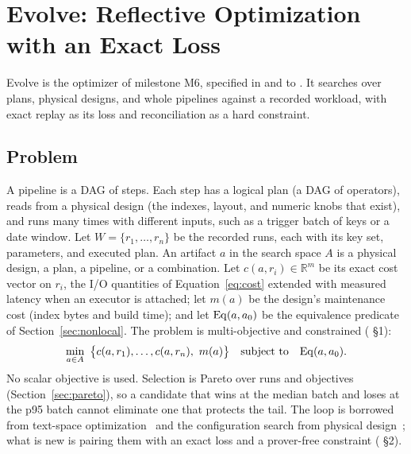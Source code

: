 \section{Evolve: Reflective Optimization with an Exact Loss}\label{sec:evolve}

Evolve is the optimizer of milestone M6, specified in  and
 to . It searches over plans, physical designs, and whole
pipelines against a recorded workload, with exact replay as its loss and
reconciliation as a hard constraint.

\subsection{Problem}\label{sec:problem}

A pipeline is a DAG of steps. Each step has a logical plan (a DAG of
operators), reads from a physical design (the indexes, layout, and numeric
knobs that exist), and runs many times with different inputs, such as a trigger
batch of keys or a date window. Let $W = \{r_1, \dots, r_n\}$ be the recorded
runs, each with its key set, parameters, and executed plan. An artifact $a$ in
the search space $A$ is a physical design, a plan, a pipeline, or a combination.
Let $c(a, r_i) \in \mathbb{R}^{m}$ be its exact cost vector on $r_i$, the I/O
quantities of Equation~\eqref{eq:cost} extended with measured latency when an
executor is attached; let $m(a)$ be the design's maintenance cost (index bytes
and build time); and let $\mathrm{Eq}(a, a_0)$ be the equivalence predicate of
Section~\ref{sec:nonlocal}. The problem is multi-objective and constrained
( \S1):
\begin{equation}\label{eq:problem}
  \min_{a \in A}\ \big\{ c(a, r_1), \dots, c(a, r_n),\ m(a) \big\}
  \quad \text{subject to} \quad \mathrm{Eq}(a, a_0).
\end{equation}
No scalar objective is used. Selection is Pareto over runs and objectives
(Section~\ref{sec:pareto}), so a candidate that wins at the median batch and
loses at the p95 batch cannot eliminate one that protects the tail. The loop
is borrowed from text-space optimization~\cite{gepa,skillopt,textgrad} and the
configuration search from physical design~\cite{autoadmin1997}; what is new is
pairing them with an exact loss and a prover-free constraint (
\S2).

